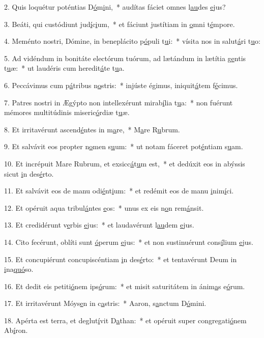 2. Quis loquétur poténtias D\uline{ó}m\uline{i}ni,~* audítas fáciet omnes l\uline{au}des \uline{e}jus?\par 
3. Beáti, qui custódiunt jud\uline{í}c\uline{i}um,~* et fáciunt justítiam in \uline{o}mni t\uline{é}mpore.\par 
4. Meménto nostri, Dómine, in beneplácito p\uline{ó}puli t\uline{u}i:~* vísita nos in salut\uline{á}ri t\uline{u}o:\par 
5. Ad vidéndum in bonitáte electórum tuórum, ad lætándum in lætítia g\uline{e}ntis t\uline{u}æ:~* ut laudéris cum heredit\uline{á}te t\uline{u}a.\par 
6. Peccávimus cum p\uline{á}tribus n\uline{o}stris:~* injúste égimus, iniquit\uline{á}tem f\uline{é}cimus.\par 
7. Patres nostri in Ægýpto non intellexérunt mirab\uline{í}lia t\uline{u}a:~* non fuérunt mémores multitúdinis miseric\uline{ó}rdiæ t\uline{u}æ.\par 
8. Et irritavérunt ascend\uline{é}ntes in m\uline{a}re,~* M\uline{a}re R\uline{u}brum.\par 
9. Et salvávit eos propter n\uline{o}men s\uline{u}um:~* ut notam fáceret pot\uline{é}ntiam s\uline{u}am.\par 
10. Et incrépuit Mare Rubrum, et exsicc\uline{á}t\uline{u}m est,~* et dedúxit eos in abýssis sicut \uline{i}n des\uline{é}rto.\par 
11. Et salvávit eos de manu odi\uline{é}nt\uline{i}um:~* et redémit eos de manu \uline{i}nim\uline{í}ci.\par 
12. Et opéruit aqua tribul\uline{á}ntes \uline{e}os:~* unus ex eis n\uline{o}n rem\uline{á}nsit.\par 
13. Et credidérunt v\uline{e}rbis \uline{e}jus:~* et laudavérunt l\uline{au}dem \uline{e}jus.\par 
14. Cito fecérunt, oblíti sunt \uline{ó}perum \uline{e}jus:~* et non sustinuérunt cons\uline{í}lium \uline{e}jus.\par 
15. Et concupiérunt concupiscéntiam \uline{i}n des\uline{é}rto:~* et tentavérunt Deum in \uline{i}na\uline{quó}so.\par 
16. Et dedit eis petiti\uline{ó}nem ips\uline{ó}rum:~* et misit saturitátem in ánim\uline{a}s e\uline{ó}rum.\par 
17. Et irritavérunt Móys\uline{e}n in c\uline{a}stris:~* Aaron, s\uline{a}nctum D\uline{ó}mini.\par 
18. Apérta est terra, et deglut\uline{í}vit D\uline{a}than:~* et opéruit super congregati\uline{ó}nem Ab\uline{í}ron.\par 
